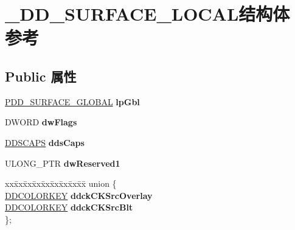 \hypertarget{struct___d_d___s_u_r_f_a_c_e___l_o_c_a_l}{}\section{\+\_\+\+D\+D\+\_\+\+S\+U\+R\+F\+A\+C\+E\+\_\+\+L\+O\+C\+A\+L结构体 参考}
\label{struct___d_d___s_u_r_f_a_c_e___l_o_c_a_l}
\subsection*{Public 属性}
\begin{DoxyCompactItemize}
\item 
\mbox{\label{struct___d_d___s_u_r_f_a_c_e___l_o_c_a_l_a2978434d4dccf672fe3f5159801951a6}} 
\hyperlink{struct___d_d___s_u_r_f_a_c_e___g_l_o_b_a_l}{P\+D\+D\+\_\+\+S\+U\+R\+F\+A\+C\+E\+\_\+\+G\+L\+O\+B\+AL} {\bfseries lp\+Gbl}
\item 
\mbox{\label{struct___d_d___s_u_r_f_a_c_e___l_o_c_a_l_a8e741b352cdc5e5b7a2a479947073095}} 
D\+W\+O\+RD {\bfseries dw\+Flags}
\item 
\mbox{\label{struct___d_d___s_u_r_f_a_c_e___l_o_c_a_l_ae0d6244d695c9bb3583cb96c8746bc9b}} 
\hyperlink{struct___d_d_s_c_a_p_s}{D\+D\+S\+C\+A\+PS} {\bfseries dds\+Caps}
\item 
\mbox{\label{struct___d_d___s_u_r_f_a_c_e___l_o_c_a_l_ac9a4e75dce05a11fead49fdca478fa30}} 
U\+L\+O\+N\+G\+\_\+\+P\+TR {\bfseries dw\+Reserved1}
\item 
\mbox{\label{struct___d_d___s_u_r_f_a_c_e___l_o_c_a_l_a28679aa3d9ecb750ea06559a71c465de}} 
\begin{tabbing}
xx\=xx\=xx\=xx\=xx\=xx\=xx\=xx\=xx\=\kill
union \{\\
\>\hyperlink{struct_d_d_c_o_l_o_r_k_e_y}{DDCOLORKEY} {\bfseries ddckCKSrcOverlay}\\
\>\hyperlink{struct_d_d_c_o_l_o_r_k_e_y}{DDCOLORKEY} {\bfseries ddckCKSrcBlt}\\
\}; \\


\end{tabbing}
\end{DoxyCompactItemize}
